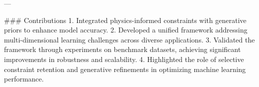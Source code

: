 ---

### Contributions  
1. Integrated physics-informed constraints with generative priors to enhance model accuracy.  
2. Developed a unified framework addressing multi-dimensional learning challenges across diverse applications.  
3. Validated the framework through experiments on benchmark datasets, achieving significant improvements in robustness and scalability.  
4. Highlighted the role of selective constraint retention and generative refinements in optimizing machine learning performance.  

